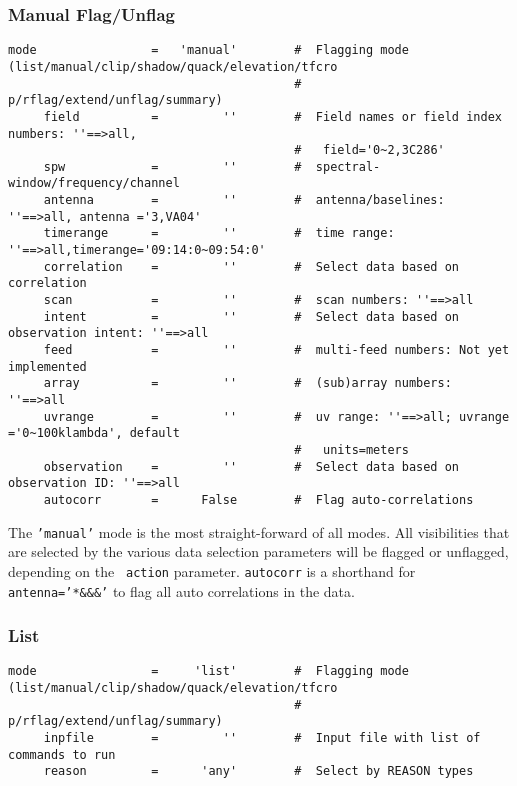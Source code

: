 \subsubsection{Manual Flag/Unflag}
\label{section:edit.tflagdata.mode.manual}

\small
\begin{verbatim}
mode                =   'manual'        #  Flagging mode (list/manual/clip/shadow/quack/elevation/tfcro
                                        #   p/rflag/extend/unflag/summary)
     field          =         ''        #  Field names or field index numbers: ''==>all,
                                        #   field='0~2,3C286'
     spw            =         ''        #  spectral-window/frequency/channel
     antenna        =         ''        #  antenna/baselines: ''==>all, antenna ='3,VA04'
     timerange      =         ''        #  time range: ''==>all,timerange='09:14:0~09:54:0'
     correlation    =         ''        #  Select data based on correlation
     scan           =         ''        #  scan numbers: ''==>all
     intent         =         ''        #  Select data based on observation intent: ''==>all
     feed           =         ''        #  multi-feed numbers: Not yet implemented
     array          =         ''        #  (sub)array numbers: ''==>all
     uvrange        =         ''        #  uv range: ''==>all; uvrange ='0~100klambda', default
                                        #   units=meters
     observation    =         ''        #  Select data based on observation ID: ''==>all
     autocorr       =      False        #  Flag auto-correlations
\end{verbatim}
\normalsize

The {\tt 'manual'} mode is the most straight-forward of all modes. All
visibilities that are selected by the various data selection
parameters will be flagged or unflagged, depending on the {\tt
  action} parameter. {\tt autocorr} is a shorthand for {\tt
  antenna='*\&\&\&'} to flag all auto correlations in the data.


\subsubsection{List}
\label{section:edit.tflagdata.mode.list}


\small
\begin{verbatim}
mode                =     'list'        #  Flagging mode (list/manual/clip/shadow/quack/elevation/tfcro
                                        #   p/rflag/extend/unflag/summary)
     inpfile        =         ''        #  Input file with list of commands to run
     reason         =      'any'        #  Select by REASON types
\end{verbatim}
\normalsize

